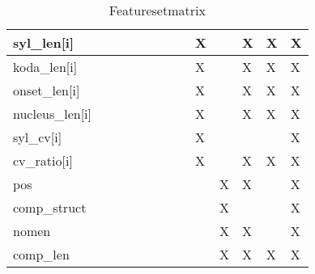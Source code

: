 \begin{sidewaystable}
{\begin{tabular}{|l|l|l|l|l|l|l|l|l|l|l|l|l|}
syl\_len{[}i{]}           &               &              &             &               &              &                &            & X               &            & X            & X             & X         \\ \hline
koda\_len{[}i{]}          &               &              &             &               &              &                &            & X               &            & X            & X             & X         \\ \hline
onset\_len{[}i{]}         &               &              &             &               &              &                &            & X               &            & X            & X             & X         \\ \hline
nucleus\_len{[}i{]}       &               &              &             &               &              &                &            & X               &            & X            & X             & X         \\ \hline
syl\_cv{[}i{]}            &               &              &             &               &              &                &            & X               &            &              &               & X         \\ \hline
cv\_ratio{[}i{]}          &               &              &             &               &              &                &            & X               &            & X            & X             & X         \\ \hline
pos                       &               &              &             &               &              &                &            &                 & X          & X            &               & X         \\ \hline
comp\_struct              &               &              &             &               &              &                &            &                 & X          &              &               & X         \\ \hline
nomen                     &               &              &             &               &              &                &            &                 & X          & X            &               & X         \\ \hline
comp\_len                 &               &              &             &               &              &                &            &                 & X          & X            & X             & X         \\ \hline
\end{tabular}%
}
\caption{Featuresetmatrix}
\end{sidewaystable}